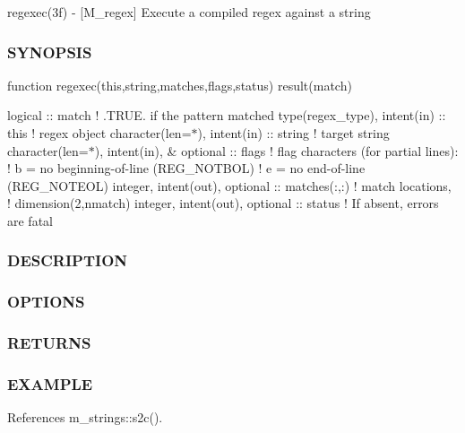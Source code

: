regexec(3f) -\/ \mbox{[}M\+\_\+regex\mbox{]} Execute a compiled regex against a string \subsubsection*{S\+Y\+N\+O\+P\+S\+IS}

function regexec(this,string,matches,flags,status) result(match)

logical \+:\+: match ! .T\+R\+UE. if the pattern matched type(regex\+\_\+type), intent(in) \+:\+: this ! regex object character(len=$\ast$), intent(in) \+:\+: string ! target string character(len=$\ast$), intent(in), \& optional \+:\+: flags ! flag characters (for partial lines)\+: ! b = no beginning-\/of-\/line (R\+E\+G\+\_\+\+N\+O\+T\+B\+OL) ! e = no end-\/of-\/line (R\+E\+G\+\_\+\+N\+O\+T\+E\+OL) integer, intent(out), optional \+:\+: matches(\+:,\+:) ! match locations, ! dimension(2,nmatch) integer, intent(out), optional \+:\+: status ! If absent, errors are fatal \subsubsection*{D\+E\+S\+C\+R\+I\+P\+T\+I\+ON}

\subsubsection*{O\+P\+T\+I\+O\+NS}

\subsubsection*{R\+E\+T\+U\+R\+NS}

\subsubsection*{E\+X\+A\+M\+P\+LE}

References m\+\_\+strings\+::s2c().

